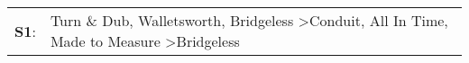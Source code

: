 \begin{supertabular}{p{0.03\textwidth}p{0.92\textwidth}}
 \textbf{S1}:  &  Turn \& Dub\textsuperscript{}, \enspace Walletsworth\textsuperscript{}, \enspace Bridgeless\textsuperscript{} \textgreater \enspace Conduit\textsuperscript{}, \enspace All In Time\textsuperscript{}, \enspace Made to Measure\textsuperscript{} \textgreater \enspace Bridgeless\textsuperscript{}  \enspace  \\
\end{supertabular}
